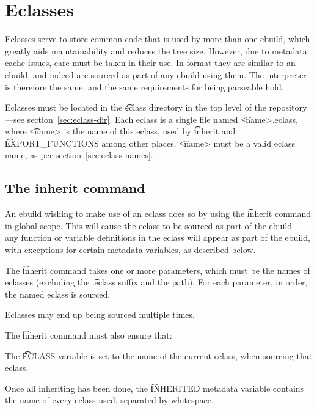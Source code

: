 \chapter{Eclasses}
\label{ch:eclasses}

Eclasses serve to store common code that is used by more than one ebuild, which greatly aids
maintainability and reduces the tree size. However, due to metadata cache issues, care must be taken
in their use. In format they are similar to an ebuild, and indeed are sourced as part of any ebuild
using them. The interpreter is therefore the same, and the same requirements for being parseable
hold.

Eclasses must be located in the \t{eclass} directory in the top level of the repository---see
section~\ref{sec:eclass-dir}. Each eclass is a single file named \t{<name>.eclass}, where \t{<name>}
is the name of this eclass, used by \t{inherit} and \t{EXPORT_FUNCTIONS} among other places.
\t{<name>} must be a valid eclass name, as per section~\ref{sec:eclass-names}.

\section{The inherit command}
\label{sec:inherit}

An ebuild wishing to make use of an eclass does so by using the \t{inherit} command in global scope.
This will cause the eclass to be sourced as part of the ebuild---any function or variable
definitions in the eclass will appear as part of the ebuild, with exceptions for certain metadata
variables, as described below.

The \t{inherit} command takes one or more parameters, which must be the names of eclasses (excluding
the \t{.eclass} suffix and the path). For each parameter, in order, the named eclass is sourced.

Eclasses may end up being sourced multiple times.

The \t{inherit} command must also ensure that:

\begin{compactitem}
\item The \t{ECLASS} variable is set to the name of the current eclass, when sourcing that eclass.
\item Once all inheriting has been done, the \t{INHERITED} metadata variable contains the name of
    every eclass used, separated by whitespace.
\end{compactitem}

